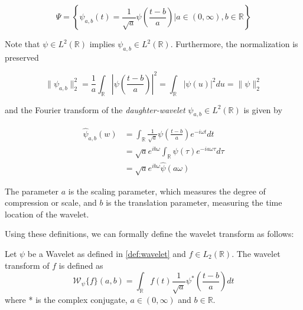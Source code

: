 \begin{equation}
    \Psi = \left\{ \psi_{a, b}(t) = \frac{1}{\sqrt{a}} \psi \left( \frac{t - b}{a} \right) | a \in (0, \infty), b \in \mathbb{R} \right\}
\end{equation}

Note that $\psi \in L^2(\mathbb{R})$ implies $\psi_{a, b} \in L^2(\mathbb{R})$. Furthermore, the normalization is preserved

\begin{equation}
    \| \psi_{a, b} \|^2_2 = \frac{1}{a} \int_{\mathbb{R}} \left| \psi \left(\frac{t - b}{a}\right) \right|^2 = \int_{\mathbb{R}} | \psi (u) |^2 du = \|\psi \|^2_2
\end{equation}

and the Fourier transform of the \textit{daughter-wavelet} $\psi_{a, b} \in L^2(\mathbb{R})$ is given by

\begin{align}
    \hat{\psi}_{a, b}(w) &= \int_{\mathbb{R}} \frac{1}{\sqrt{a}} \psi \left( \frac{t-b}{a}\right) e^{-i \omega t} dt \nonumber \\
                         &= \sqrt{a} e^{i b \omega} \int_{\mathbb{R}} \psi(\tau) e^{-i a \omega \tau} d \tau \nonumber \\
                         &= \sqrt{a} e^{i b \omega} \hat{\psi}(a \omega)
\end{align}

The parameter $a$ is the scaling parameter, which measures the degree of compression or scale, and $b$ is the translation parameter, measuring the time location of the wavelet.

Using these definitions, we can formally define the wavelet transform as follows: 
\begin{definition}
    Let $\psi$ be a Wavelet as defined in \ref{def:wavelet} and $f \in L_2(\mathbb{R})$. The wavelet transform of $f$ is defined as 
    \begin{equation}
        \mathscr{W}_{\psi}\{f\}(a,b) = \int_{\mathbb{R}}f(t)\frac{1}{\sqrt{a}} \psi^{\ast} \left( \frac{t - b}{a} \right) dt
        \label{eq:def_cwt}
    \end{equation}
    where * is the complex conjugate, $a \in (0, \infty)$ and $b \in \mathbb{R}$.
    \label{def:cwt}
\end{definition}

